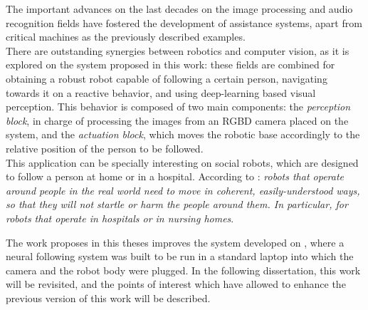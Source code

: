 The important advances on the last decades on the image processing and audio recognition fields have fostered the development of assistance systems, apart from critical machines as the previously described examples.\\



There are outstanding synergies between robotics and computer vision, as it is explored on the system proposed in this work: these fields are combined for obtaining a robust robot capable of following a certain person, navigating towards it on a reactive behavior, and using deep-learning based visual perception. This behavior is composed of two main components: the \textit{perception block}, in charge of processing the images from an RGBD camera placed on the system, and the \textit{actuation block}, which moves the robotic base accordingly to the relative position of the person to be followed.\\

This application can be specially interesting on social robots, which are designed to follow a person at home or in a hospital. According to \cite{natural_personfollowing}: \textit{robots that operate around people in the real world need to move in coherent, easily-understood ways, so that they will not startle or harm the people around them. In particular, for robots that operate in hospitals or in nursing homes}. 



The work proposes in this theses improves the system developed on \cite{tfg}, where a neural following system was built to be run in a standard laptop into which the camera and the robot body were plugged. In the following dissertation, this work will be revisited, and the points of interest which have allowed to enhance the previous version of this work will be described.\\
	
